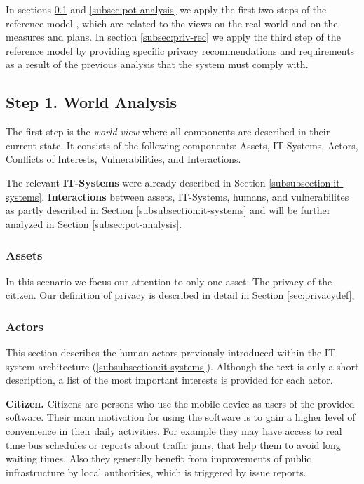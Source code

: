 \documentclass[runningheads,a4paper]{llncs}
\begin{document}
In sections \ref{subsec:world-analysis} and \ref{subsec:pot-analysis} we apply the first two steps of the reference model \cite{Grimm:ItSecRefModel}, which are related to the views on the real world and on the measures and plans. In section \ref{subsec:priv-rec} we apply the third step of the reference model by providing specific privacy recommendations and requirements as a result of the previous analysis that the system must comply with. 


\subsection{Step 1. World Analysis}

\label{subsec:world-analysis}

The first step is the \emph{world view} where all components are described in their current state. It consists of the following components: Assets, IT-Systems, Actors, Conflicts of Interests, Vulnerabilities, and Interactions.

The relevant \textbf{IT-Systems} were already described in Section \ref{subsubsection:it-systems}.
\textbf{Interactions} between assets, IT-Systems, humans, and vulnerabilites as partly described in Section \ref{subsubsection:it-systems} and will be further analyzed in Section \ref{subsec:pot-analysis}.
	

\subsubsection{Assets}

In this scenario we focus our attention to only one asset: The privacy of the citizen. Our definition of privacy is described in detail in Section \ref{sec:privacydef},

\subsubsection{Actors}
\label{subsubsection:humans}

This section describes the human actors previously introduced within the IT system architecture (\ref{subsubsection:it-systems}). Although the text is only a short description, a list of the most important interests is provided for each actor.

\textbf{Citizen.}
Citizens are persons who use the mobile device as users of the provided software.
Their main motivation for using the software is to gain a higher level of convenience in their daily activities. For example they may have access to real time bus schedules or reports about traffic jams, that help them to avoid long waiting times. Also they generally benefit from improvements of public infrastructure by local authorities, which is triggered by issue reports.
\end{document}
